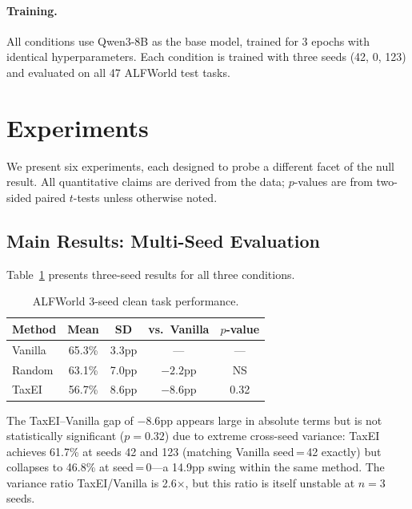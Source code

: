 \documentclass[11pt,a4paper]{article}
\begin{document}
\paragraph{Training.}
All conditions use Qwen3-8B as the base model, trained for 3 epochs with identical hyperparameters.
Each condition is trained with three seeds (42, 0, 123) and evaluated on all 47 ALFWorld test tasks.

\section{Experiments}

We present six experiments, each designed to probe a different facet of the null result.
All quantitative claims are derived from the data; $p$-values are from two-sided paired $t$-tests unless otherwise noted.

\subsection{Main Results: Multi-Seed Evaluation}\label{sec:main}

Table~\ref{tab:main} presents three-seed results for all three conditions.

\begin{table}[h]
\centering
\caption{ALFWorld 3-seed clean task performance.}
\label{tab:main}
\begin{tabular}{lcccc}
\toprule
\textbf{Method} & \textbf{Mean} & \textbf{SD} & \textbf{vs.\ Vanilla} & \textbf{$p$-value} \\
\midrule
Vanilla & 65.3\% & 3.3pp & --- & --- \\
Random  & 63.1\% & 7.0pp & $-2.2$pp & NS \\
TaxEI   & 56.7\% & 8.6pp & $-8.6$pp & 0.32 \\
\bottomrule
\end{tabular}
\end{table}

The TaxEI--Vanilla gap of $-8.6$pp appears large in absolute terms but is not statistically significant ($p{=}0.32$) due to extreme cross-seed variance: TaxEI achieves 61.7\% at seeds 42 and 123 (matching Vanilla seed\,=\,42 exactly) but collapses to 46.8\% at seed\,=\,0---a 14.9pp swing within the same method.
The variance ratio TaxEI/Vanilla is 2.6$\times$, but this ratio is itself unstable at $n{=}3$ seeds.
\end{document}
